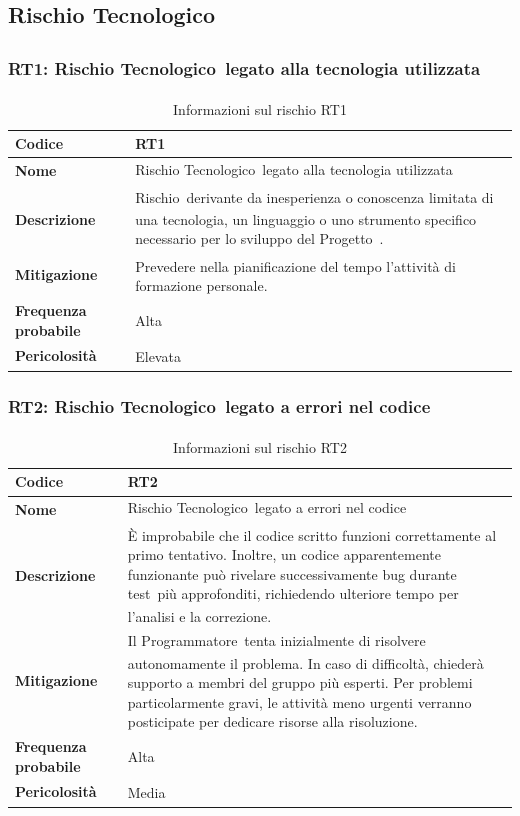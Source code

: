 \documentclass[a4paper,12pt]{article}
\newcommand{\pediceG}{\texorpdfstring{\textsubscript{\scalebox{0.6}{\textbf{G}}}~}{G}}
\begin{document}
\newpage
\subsection{Rischio Tecnologico\pediceG}

\subsubsection{RT1: Rischio Tecnologico\pediceG legato alla tecnologia utilizzata}
\begin{table}[H]
\centering
\begin{tabular}{|>{\raggedright\arraybackslash}p{4cm}|>{\raggedright\arraybackslash}p{10cm}|}
\hline
\textbf{Codice} & RT1 \\
\hline
\textbf{Nome} & Rischio Tecnologico\pediceG legato alla tecnologia utilizzata \\
\hline
\textbf{Descrizione} & Rischio\pediceG derivante da inesperienza o conoscenza limitata di una tecnologia, un linguaggio o uno strumento specifico necessario per lo sviluppo del Progetto\pediceG. \\
\hline
\textbf{Mitigazione\pediceG} & Prevedere nella pianificazione del tempo l'attività di formazione personale. \\
\hline
\textbf{Frequenza probabile} & Alta \\
\hline
\textbf{Pericolosità\pediceG} & Elevata \\
\hline
\end{tabular}
\caption{Informazioni sul rischio RT1}
\label{tab:rt1}
\end{table}

\subsubsection{RT2: Rischio Tecnologico\pediceG legato a errori nel codice}
\begin{table}[H]
\centering
\begin{tabular}{|>{\raggedright\arraybackslash}p{4cm}|>{\raggedright\arraybackslash}p{10cm}|}
\hline
\textbf{Codice} & RT2 \\
\hline
\textbf{Nome} & Rischio Tecnologico\pediceG legato a errori nel codice \\
\hline
\textbf{Descrizione} & È improbabile che il codice scritto funzioni correttamente al primo tentativo. Inoltre, un codice apparentemente funzionante può rivelare successivamente bug durante test\pediceG più approfonditi, richiedendo ulteriore tempo per l'analisi e la correzione. \\
\hline
\textbf{Mitigazione\pediceG} & Il Programmatore\pediceG tenta inizialmente di risolvere autonomamente il problema. In caso di difficoltà, chiederà supporto a membri del gruppo più esperti. Per problemi particolarmente gravi, le attività meno urgenti verranno posticipate per dedicare risorse alla risoluzione. \\
\hline
\textbf{Frequenza probabile} & Alta \\
\hline
\textbf{Pericolosità\pediceG} & Media \\
\hline
\end{tabular}
\caption{Informazioni sul rischio RT2}
\label{tab:rt2}
\end{table}
\end{document}
